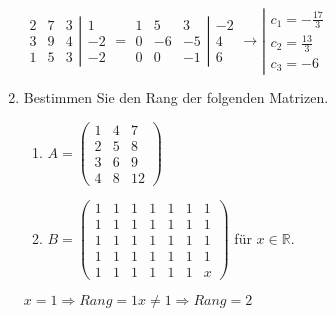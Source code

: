 \documentclass[12pt,a4paper]{scrreprt}
\newcommand{\R}{\mathds{R}}
\newcommand{\Lsg}{\textbf{Lsg.:}}
\begin{document}
\begin{enumerate}
$
\begin{matrix}
2	&	7	&	3	\\
3	&	9	&	4	\\
1	&	5	&	3
\end{matrix}
\left|
\begin{matrix}
1	\\
-2	\\
-2
\end{matrix}
\right.
=
\begin{matrix}
1	&	5	&	3	\\
0	&	-6	&	-5	\\
0	&	0	&	-1
\end{matrix}
\left|
\begin{matrix}
-2	\\
4	\\
6
\end{matrix}
\right.
\rightarrow
\left|
\begin{matrix}
	c_1=-\frac{17}{3}	\\
	c_2=\frac{13}{3}	\\
	c_3=-6
\end{matrix}
\right.
$

	\item Bestimmen Sie den Rang der folgenden Matrizen. %
	\begin{enumerate}
		\item $A=\begin{pmatrix}
 1 & 4 & 7 \\
 2 & 5 & 8 \\
 3 & 6 & 9 \\
 4 & 8 & 12 \end{pmatrix}$
 
 
		\item $B=\begin{pmatrix}
 1 & 1 & 1 & 1 & 1 & 1 & 1\\
 1 & 1 & 1 & 1 & 1 & 1 & 1 \\
 1 & 1 & 1 & 1 & 1 & 1 & 1\\
 1 & 1 & 1 & 1 & 1 & 1 & 1 \\
 1 & 1 & 1 & 1 & 1 & 1 & x \end{pmatrix}$ für $x \in \R.$
	\end{enumerate}

%

$
x=1 \Rightarrow Rang=1
x\neq 1 \Rightarrow Rang=2
$


\end{enumerate}
\end{document}
